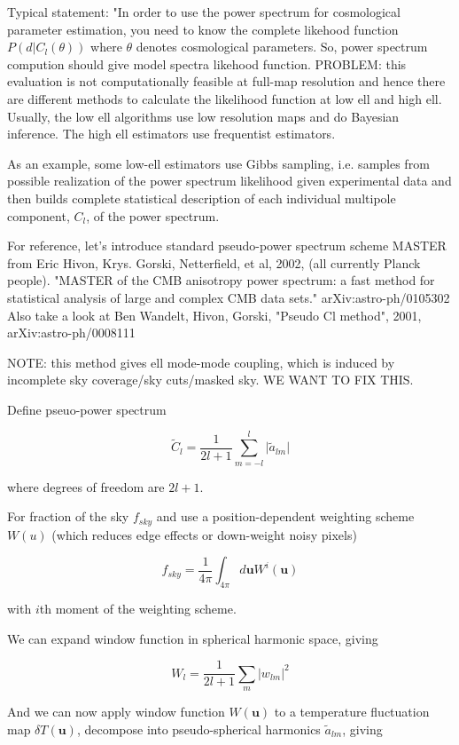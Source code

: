\documentclass[a4paper, 11pt]{article}
\begin{document}
Typical statement: "In order to use the power spectrum for cosmological parameter estimation, you need to know the complete likehood function $P(d | C_l(\theta))$ where $\theta$ denotes cosmological parameters. So, power spectrum compution should give model spectra likehood function. PROBLEM: this evaluation is not computationally feasible at full-map resolution and hence there are different methods to calculate the likelihood function at low ell and high ell. Usually, the low ell algorithms use low resolution maps and do Bayesian inference. The high ell estimators use  frequentist estimators. 

As an example, some low-ell estimators use Gibbs sampling, i.e. samples from possible realization of the power spectrum likelihood given experimental data and then builds complete statistical description of each individual multipole component, $C_l$, of the power spectrum. 

For reference, let's introduce standard pseudo-power spectrum scheme MASTER from Eric Hivon, Krys. Gorski, Netterfield, et al, 2002, (all currently Planck people). "MASTER of the CMB anisotropy power spectrum: a fast method for statistical analysis of large and complex CMB data sets." arXiv:astro-ph/0105302
Also take a look at Ben Wandelt, Hivon, Gorski, "Pseudo Cl method", 2001, arXiv:astro-ph/0008111

NOTE: this method gives ell mode-mode coupling, which is induced by incomplete sky coverage/sky cuts/masked sky. WE WANT TO FIX THIS. 


Define pseuo-power spectrum 

$$
\widetilde{C}_l=\frac{1}{2l+1}\sum^{l}_{m=-l}\vert \tilde{a}_{lm}  \vert
$$

where degrees of freedom are $2l+1$. 

For fraction of the sky $f_{sky}$ and use a position-dependent weighting scheme $W(u)$ (which reduces edge effects or down-weight noisy pixels)

$$
f_{sky}=\frac{1}{4\pi}\int_{4\pi}d\textbf{u}W^{i}(\textbf{u})
$$

with $i$th moment of the weighting scheme. 

We can expand window function in spherical harmonic space, giving

$$
W_l=\frac{1}{2l+1}\sum_{m}\vert w_{lm}\vert^2
$$

And we can now apply window function $W(\textbf{u})$ to a temperature fluctuation map $\delta T(\textbf{u})$, decompose into pseudo-spherical harmonics $\tilde{a}_{lm}$, giving
\end{document}

